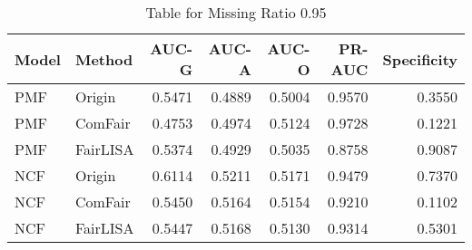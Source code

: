 \begin{table}
\centering
\caption{Table for Missing Ratio 0.95}
\label{tab:missing_0.95}
\begin{tabular}{llrrrrr}
\toprule
Model &   Method &  AUC-G &  AUC-A &  AUC-O &  PR-AUC &  Specificity \\
\midrule
  PMF &   Origin & 0.5471 & 0.4889 & 0.5004 &  0.9570 &       0.3550 \\
  PMF &  ComFair & 0.4753 & 0.4974 & 0.5124 &  0.9728 &       0.1221 \\
  PMF & FairLISA & 0.5374 & 0.4929 & 0.5035 &  0.8758 &       0.9087 \\
  NCF &   Origin & 0.6114 & 0.5211 & 0.5171 &  0.9479 &       0.7370 \\
  NCF &  ComFair & 0.5450 & 0.5164 & 0.5154 &  0.9210 &       0.1102 \\
  NCF & FairLISA & 0.5447 & 0.5168 & 0.5130 &  0.9314 &       0.5301 \\
\bottomrule
\end{tabular}
\end{table}
